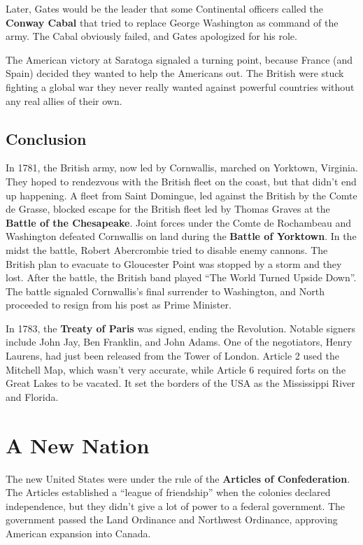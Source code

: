 Later, Gates would be the leader that some Continental officers called the \textbf{Conway Cabal}
that tried to replace George Washington as command of the army.
The Cabal obviously failed, and Gates apologized for his role.

The American victory at Saratoga signaled a turning point,
because France (and Spain) decided they wanted to help the Americans out.
The British were stuck fighting a global war they never really wanted
against powerful countries without any real allies of their own.

\subsection*{Conclusion}

In 1781, the British army, now led by Cornwallis, marched on Yorktown, Virginia.
They hoped to rendezvous with the British fleet on the coast,
but that didn't end up happening.
A fleet from Saint Domingue, led against the British by the Comte de Grasse,
blocked escape for the British fleet led by Thomas Graves at the \textbf{Battle of the Chesapeake}.
Joint forces under the Comte de Rochambeau and Washington defeated Cornwallis on land
during the \textbf{Battle of Yorktown}.
In the midst the battle, Robert Abercrombie tried to disable enemy cannons.
The British plan to evacuate to Gloucester Point was stopped by a storm and they lost.
After the battle, the British band played ``The World Turned Upside Down''.
The battle signaled Cornwallis's final surrender to Washington,
and North proceeded to resign from his post as Prime Minister.

In 1783, the \textbf{Treaty of Paris} was signed, ending the Revolution.
Notable signers include John Jay, Ben Franklin, and John Adams.
One of the negotiators, Henry Laurens, had just been released from the Tower of London.
Article 2 used the Mitchell Map, which wasn't very accurate,
while Article 6 required forts on the Great Lakes to be vacated.
It set the borders of the USA as the Mississippi River and Florida.

\section{A New Nation}

The new United States were under the rule of the \textbf{Articles of Confederation}.
The Articles established a ``league of friendship'' when the colonies declared independence,
but they didn't give a lot of power to a federal government.
The government passed the Land Ordinance and Northwest Ordinance,
approving American expansion into Canada.

